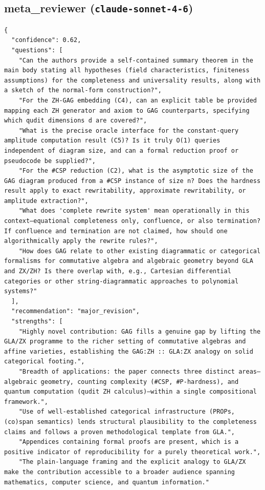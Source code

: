 \documentclass[11pt]{article}
\begin{document}
\subsection*{meta_reviewer (\texttt{claude-sonnet-4-6})}
\begin{verbatim}
{
  "confidence": 0.62,
  "questions": [
    "Can the authors provide a self-contained summary theorem in the main body stating all hypotheses (field characteristics, finiteness assumptions) for the completeness and universality results, along with a sketch of the normal-form construction?",
    "For the ZH-GAG embedding (C4), can an explicit table be provided mapping each ZH generator and axiom to GAG counterparts, specifying which qudit dimensions d are covered?",
    "What is the precise oracle interface for the constant-query amplitude computation result (C5)? Is it truly O(1) queries independent of diagram size, and can a formal reduction proof or pseudocode be supplied?",
    "For the #CSP reduction (C2), what is the asymptotic size of the GAG diagram produced from a #CSP instance of size n? Does the hardness result apply to exact rewritability, approximate rewritability, or amplitude extraction?",
    "What does 'complete rewrite system' mean operationally in this context—equational completeness only, confluence, or also termination? If confluence and termination are not claimed, how should one algorithmically apply the rewrite rules?",
    "How does GAG relate to other existing diagrammatic or categorical formalisms for commutative algebra and algebraic geometry beyond GLA and ZX/ZH? Is there overlap with, e.g., Cartesian differential categories or other string-diagrammatic approaches to polynomial systems?"
  ],
  "recommendation": "major_revision",
  "strengths": [
    "Highly novel contribution: GAG fills a genuine gap by lifting the GLA/ZX programme to the richer setting of commutative algebras and affine varieties, establishing the GAG:ZH :: GLA:ZX analogy on solid categorical footing.",
    "Breadth of applications: the paper connects three distinct areas—algebraic geometry, counting complexity (#CSP, #P-hardness), and quantum computation (qudit ZH calculus)—within a single compositional framework.",
    "Use of well-established categorical infrastructure (PROPs, (co)span semantics) lends structural plausibility to the completeness claims and follows a proven methodological template from GLA.",
    "Appendices containing formal proofs are present, which is a positive indicator of reproducibility for a purely theoretical work.",
    "The plain-language framing and the explicit analogy to GLA/ZX make the contribution accessible to a broader audience spanning mathematics, computer science, and quantum information."

\end{verbatim}
\end{document}
